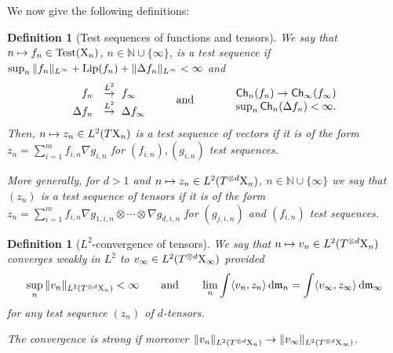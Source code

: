 \documentclass[11pt]{article}
\numberwithin{equation}{section}
\newtheorem{definition}[theorem]{Definition}
\newcommand{\N}{\mathbb{N}}
\newcommand{\X}{{\rm X}}
\newcommand{\mm}{{\mathfrak m}}
\newcommand{\ch}{{\sf Ch}}
\renewcommand{\d}{{\rm d}}
\newcommand{\Lip}{{\rm Lip}}
\newcommand\la{\langle}
\newcommand\ra{\rangle}
\newcommand{\test}{{\rm Test}}
\begin{document}
We now  give the following definitions:
\begin{definition}[Test sequences of functions and tensors]
We say that $n\mapsto f_n\in\test(\X_n)$, $n\in\N\cup\{\infty\}$, is a test sequence if  $\sup_n\|f_n\|_{L^\infty}+\Lip(f_n)+\|\Delta f_n\|_{L^\infty}<\infty$ and
\begin{equation}
\label{eq:deftestseq}
\begin{array}{rl}
f_n&\stackrel{L^2}\to\  f_\infty\\
\Delta f_n&\stackrel{L^2}\to\ \Delta f_\infty
\end{array}
\qquad\text{ and }\qquad
\begin{array}{rl}
&\ch_n(f_n)\to  \ch_\infty(f_\infty)\\
&\sup_n\ch_n(\Delta f_n)<\infty.
\end{array}
\end{equation}
Then, $n\mapsto z_n\in L^2(T\X_n)$ is a test sequence of vectors if it is of the form $z_n=\sum_{i=1}^mf_{i,n}\nabla g_{i,n}$ for $(f_{i,n}),(g_{i,n})$ test sequences.

More generally, for  $d> 1$ and $n\mapsto z_n\in L^2(T^{\otimes d}\X_n)$, $n\in\N\cup\{\infty\}$ we say that   $(z_n)$ is a test sequence of tensors if it is of the form $z_n=\sum_{i=1}^mf_{i,n}\nabla g_{1,i,n}\otimes\cdots\otimes\nabla g_{d,i,n}$ for $(g_{j,i,n})$ and $(f_{i,n})$ test sequences.
\end{definition}
\begin{definition}[$L^2$-convergence of tensors]\label{def:convtens} We say that $n\mapsto v_n\in L^2(T^{\otimes d}\X_n)$ converges weakly in $L^2$ to $v_\infty\in L^2(T^{\otimes d}\X_\infty)$ provided 
\[
\sup_n\|v_n\|_{L^2(T^{\otimes d}\X_n)}<\infty\qquad\text{and}\qquad \lim_n\int\la v_n,z_n\ra\,\d\mm_n=\int\la v_\infty,z_\infty\ra\,\d\mm_\infty
\]
for any test sequence $(z_n)$ of $d$-tensors. 

The convergence is strong if moreover $\|v_n\|_{L^2(T^{\otimes d}\X_n)}\to \|v_\infty\|_{L^2(T^{\otimes d}\X_\infty)}$.
\end{definition}
\end{document}
